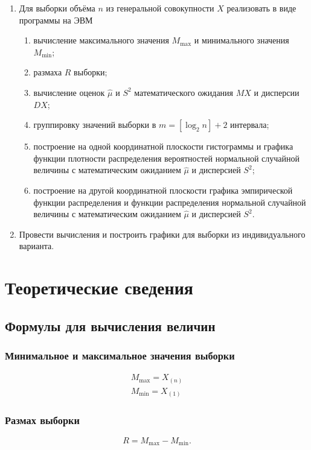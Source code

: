 \documentclass[12pt]{report}
\begin{document}
\begin{enumerate}
	\item Для выборки объёма $n$ из генеральной совокупности $X$ реализовать в виде программы на ЭВМ
	\begin{enumerate}
		\item вычисление максимального значения $M_{\max}$ и минимального значения $M_{\min}$;
		\item размаха $R$ выборки;
		\item вычисление оценок $\hat\mu$ и $S^2$ математического ожидания $MX$ и дисперсии $DX$;
		\item группировку значений выборки в $m = [\log_2 n] + 2$ интервала;
		\item построение на одной координатной плоскости гистограммы и графика функции плотности распределения вероятностей нормальной случайной величины с математическим ожиданием $\hat{\mu}$ и дисперсией $S^2$;
		\item построение на другой координатной плоскости графика эмпирической функции распределения и функции распределения нормальной случайной величины с математическим ожиданием $\hat{\mu}$ и дисперсией $S^2$.
	\end{enumerate}
	\item Провести вычисления и построить графики для выборки из индивидуального варианта.
\end{enumerate}

\chapter*{Теоретические сведения}

\section*{Формулы для вычисления величин}

\subsection*{Минимальное и максимальное значения выборки}
\begin{equation}
	\begin{aligned}
	M_{\max} = X_{(n)}\\
	M_{\min} = X_{(1)}
	\end{aligned}
\end{equation}

\subsection*{Размах выборки}
\begin{equation}
	R = M_{\max} - M_{\min}.
\end{equation}
\end{document}
